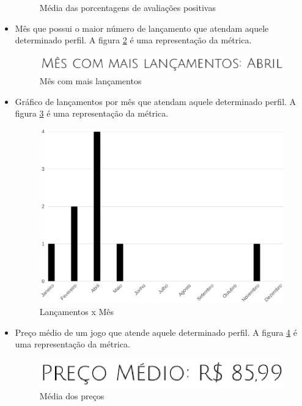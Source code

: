 \begin{itemize}
\begin{figure}
	\caption{Média das porcentagens de avaliações positivas}
	\label{image:avaliacoes}
	\end{figure}
	\item Mês que possui o maior número de lançamento que atendam aquele determinado perfil. A figura \ref{image:mes} é uma representação da métrica.
	\begin{figure}
	\centering
	\includegraphics[scale=0.5]{figuras/mes.eps}
	\caption{Mês com mais lançamentos}
	\label{image:mes}
	\end{figure}
	\item Gráfico de lançamentos por mês que atendam aquele determinado perfil. A figura \ref{image:lancxmes} é uma representação da métrica.
	\begin{figure}
	\centering
	\includegraphics[scale=0.4]{figuras/lancamentoxmes.eps}
	\caption{Lançamentos x Mês}
	\label{image:lancxmes}
	\end{figure}
	\item Preço médio de um jogo que atende aquele determinado perfil. A figura \ref{image:preco} é uma representação da métrica.
	\begin{figure}
	\centering
	\includegraphics[scale=0.5]{figuras/preco_medio.eps}
	\caption{Média dos preços}
	\label{image:preco}
	\end{figure}

\end{itemize}
